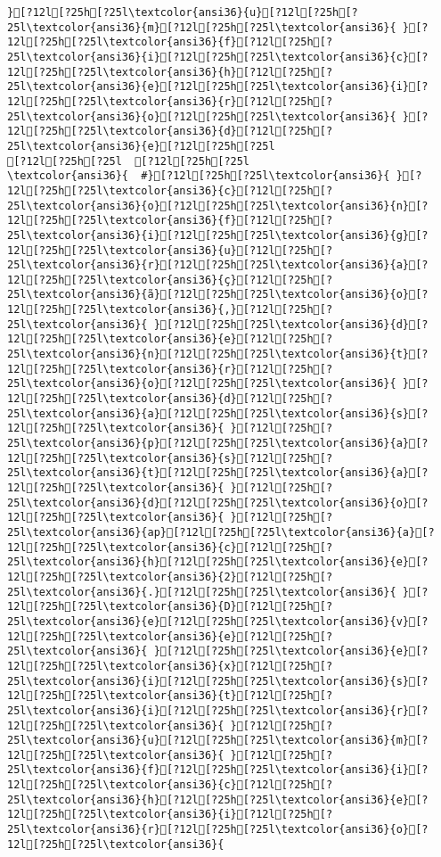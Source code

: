 \documentclass{scrartcl}
\begin{document}
\begin{Verbatim}
}[?12l[?25h[?25l\textcolor{ansi36}{u}[?12l[?25h[?25l\textcolor{ansi36}{m}[?12l[?25h[?25l\textcolor{ansi36}{ }[?12l[?25h[?25l\textcolor{ansi36}{f}[?12l[?25h[?25l\textcolor{ansi36}{i}[?12l[?25h[?25l\textcolor{ansi36}{c}[?12l[?25h[?25l\textcolor{ansi36}{h}[?12l[?25h[?25l\textcolor{ansi36}{e}[?12l[?25h[?25l\textcolor{ansi36}{i}[?12l[?25h[?25l\textcolor{ansi36}{r}[?12l[?25h[?25l\textcolor{ansi36}{o}[?12l[?25h[?25l\textcolor{ansi36}{ }[?12l[?25h[?25l\textcolor{ansi36}{d}[?12l[?25h[?25l\textcolor{ansi36}{e}[?12l[?25h[?25l
[?12l[?25h[?25l  [?12l[?25h[?25l
\textcolor{ansi36}{  #}[?12l[?25h[?25l\textcolor{ansi36}{ }[?12l[?25h[?25l\textcolor{ansi36}{c}[?12l[?25h[?25l\textcolor{ansi36}{o}[?12l[?25h[?25l\textcolor{ansi36}{n}[?12l[?25h[?25l\textcolor{ansi36}{f}[?12l[?25h[?25l\textcolor{ansi36}{i}[?12l[?25h[?25l\textcolor{ansi36}{g}[?12l[?25h[?25l\textcolor{ansi36}{u}[?12l[?25h[?25l\textcolor{ansi36}{r}[?12l[?25h[?25l\textcolor{ansi36}{a}[?12l[?25h[?25l\textcolor{ansi36}{ç}[?12l[?25h[?25l\textcolor{ansi36}{ã}[?12l[?25h[?25l\textcolor{ansi36}{o}[?12l[?25h[?25l\textcolor{ansi36}{,}[?12l[?25h[?25l\textcolor{ansi36}{ }[?12l[?25h[?25l\textcolor{ansi36}{d}[?12l[?25h[?25l\textcolor{ansi36}{e}[?12l[?25h[?25l\textcolor{ansi36}{n}[?12l[?25h[?25l\textcolor{ansi36}{t}[?12l[?25h[?25l\textcolor{ansi36}{r}[?12l[?25h[?25l\textcolor{ansi36}{o}[?12l[?25h[?25l\textcolor{ansi36}{ }[?12l[?25h[?25l\textcolor{ansi36}{d}[?12l[?25h[?25l\textcolor{ansi36}{a}[?12l[?25h[?25l\textcolor{ansi36}{s}[?12l[?25h[?25l\textcolor{ansi36}{ }[?12l[?25h[?25l\textcolor{ansi36}{p}[?12l[?25h[?25l\textcolor{ansi36}{a}[?12l[?25h[?25l\textcolor{ansi36}{s}[?12l[?25h[?25l\textcolor{ansi36}{t}[?12l[?25h[?25l\textcolor{ansi36}{a}[?12l[?25h[?25l\textcolor{ansi36}{ }[?12l[?25h[?25l\textcolor{ansi36}{d}[?12l[?25h[?25l\textcolor{ansi36}{o}[?12l[?25h[?25l\textcolor{ansi36}{ }[?12l[?25h[?25l\textcolor{ansi36}{ap}[?12l[?25h[?25l\textcolor{ansi36}{a}[?12l[?25h[?25l\textcolor{ansi36}{c}[?12l[?25h[?25l\textcolor{ansi36}{h}[?12l[?25h[?25l\textcolor{ansi36}{e}[?12l[?25h[?25l\textcolor{ansi36}{2}[?12l[?25h[?25l\textcolor{ansi36}{.}[?12l[?25h[?25l\textcolor{ansi36}{ }[?12l[?25h[?25l\textcolor{ansi36}{D}[?12l[?25h[?25l\textcolor{ansi36}{e}[?12l[?25h[?25l\textcolor{ansi36}{v}[?12l[?25h[?25l\textcolor{ansi36}{e}[?12l[?25h[?25l\textcolor{ansi36}{ }[?12l[?25h[?25l\textcolor{ansi36}{e}[?12l[?25h[?25l\textcolor{ansi36}{x}[?12l[?25h[?25l\textcolor{ansi36}{i}[?12l[?25h[?25l\textcolor{ansi36}{s}[?12l[?25h[?25l\textcolor{ansi36}{t}[?12l[?25h[?25l\textcolor{ansi36}{i}[?12l[?25h[?25l\textcolor{ansi36}{r}[?12l[?25h[?25l\textcolor{ansi36}{ }[?12l[?25h[?25l\textcolor{ansi36}{u}[?12l[?25h[?25l\textcolor{ansi36}{m}[?12l[?25h[?25l\textcolor{ansi36}{ }[?12l[?25h[?25l\textcolor{ansi36}{f}[?12l[?25h[?25l\textcolor{ansi36}{i}[?12l[?25h[?25l\textcolor{ansi36}{c}[?12l[?25h[?25l\textcolor{ansi36}{h}[?12l[?25h[?25l\textcolor{ansi36}{e}[?12l[?25h[?25l\textcolor{ansi36}{i}[?12l[?25h[?25l\textcolor{ansi36}{r}[?12l[?25h[?25l\textcolor{ansi36}{o}[?12l[?25h[?25l\textcolor{ansi36}{ 
\end{Verbatim}
\end{document}
